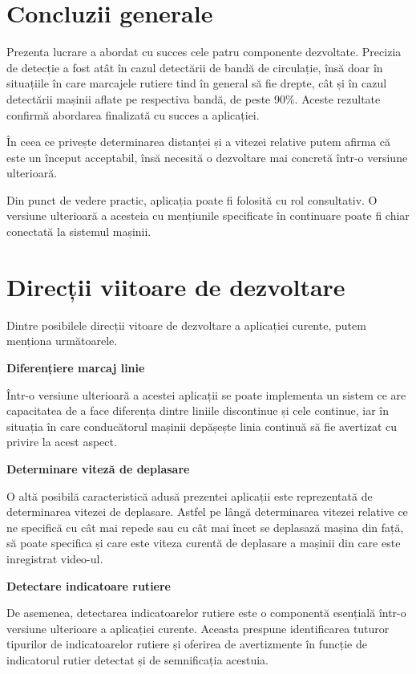 \section*{Concluzii generale}
Prezenta lucrare a abordat cu succes cele patru componente dezvoltate. Precizia de detecție a fost atât în cazul detectării de bandă de circulație, însă doar în situațiile în care marcajele rutiere tind în general să fie drepte, cât și în cazul detectării mașinii aflate pe respectiva bandă, de peste 90\%. Aceste rezultate confirmă abordarea finalizată cu succes a aplicației.  

În ceea ce privește determinarea distanței și a vitezei relative putem afirma că este un început acceptabil, însă necesită o dezvoltare mai concretă într-o versiune ulterioară.

Din punct de vedere practic, aplicația poate fi folosită cu rol consultativ. O versiune ulterioară a acesteia cu mențiunile specificate în continuare poate fi chiar conectată la sistemul mașinii.

\section*{Direcții viitoare de dezvoltare}
Dintre posibilele direcții vitoare de dezvoltare a aplicației curente, putem menționa următoarele.

\textbf{Diferențiere marcaj linie}

Într-o versiune ulterioară a acestei aplicații se poate implementa un sistem ce are capacitatea de a face diferența dintre liniile discontinue și cele continue, iar în situația în care conducătorul mașinii depășește linia continuă să fie avertizat cu privire la acest aspect.

\textbf{Determinare viteză de deplasare}

O altă posibilă caracteristică adusă prezentei aplicații este reprezentată de determinarea vitezei de deplasare. Astfel pe lângă determinarea vitezei relative ce ne specifică cu cât mai repede sau cu cât mai încet se deplasază mașina din față, să poate specifica și care este viteza curentă de deplasare a mașinii din care este inregistrat video-ul.

\textbf{Detectare indicatoare rutiere}

De asemenea, detectarea indicatoarelor rutiere este o componentă esențială într-o versiune ulterioare a aplicației curente. Aceasta prespune identificarea tuturor tipurilor de indicatoarelor rutiere și oferirea de avertizmente în funcție de indicatorul rutier detectat și de semnificația acestuia.


